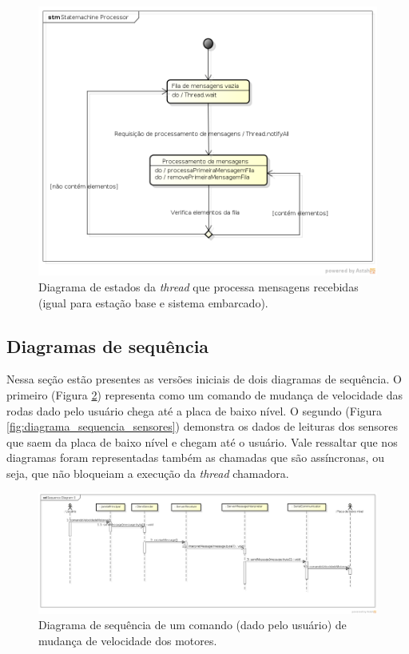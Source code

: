 \begin{figure}[H]
  \centering
  \includegraphics[width=\textwidth, keepaspectratio]{./figuras/diagrama_estados_processor.png}
  \caption{Diagrama de estados da \textit{thread} que processa mensagens recebidas (igual para estação base e sistema embarcado).}
  \label{fig:diagrama_estados_processor}
\end{figure}



\subsection{Diagramas de sequência}

Nessa seção estão presentes as versões iniciais de dois diagramas de sequência. O primeiro (Figura \ref{fig:diagrama_sequencia_motores}) representa como um comando de mudança de velocidade das rodas dado pelo usuário chega até a placa de baixo nível. O segundo (Figura \ref{fig:diagrama_sequencia_sensores}) demonstra os dados de leituras dos sensores que saem da placa de baixo nível e chegam até o usuário. Vale ressaltar que nos diagramas foram representadas também as chamadas que são assíncronas, ou seja, que não bloqueiam a execução da \textit{thread} chamadora.

\begin{figure}[H]
  \centering
  \includegraphics[width=\textwidth, keepaspectratio]{./figuras/diagrama_sequencia_motores.png}
  \caption{Diagrama de sequência de um comando (dado pelo usuário) de mudança de velocidade dos motores.}
  \label{fig:diagrama_sequencia_motores}
\end{figure}

